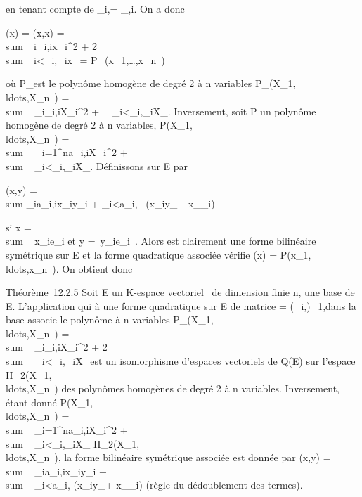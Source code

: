 \documentclass[]{article}
\begin{document}
en tenant compte de \omega\_i,\jmath = \omega\_\jmath,i. On a donc

\Phi(x) = \phi(x,x) = \\sum
\_i\omega\_i,ix\_i^2 +
2\\sum
\_i\textless{}\jmath\omega\_i,\jmathx\_ix\_\jmath =
P\_\Phi(x\_1,\ldots,x\_n~)

où P\_\Phi est le polynôme homogène de degré 2 à n variables
P\_\Phi(X\_1,\\ldots,X\_n~)
= \\sum ~
\_i\omega\_i,iX\_i^2 +\
\sum ~
\_i\textless{}\jmath\omega\_i,\jmathX\_iX\_\jmath.
Inversement, soit P un polynôme homogène de degré 2 à n variables,
P(X\_1,\\ldots,X\_n~)
= \\sum ~
\_i=1^na\_i,iX\_i^2
+ \\sum ~
\_i\textless{}\jmatha\_i,\jmathX\_iX\_\jmath. Définissons
\phi sur E par

\phi(x,y) = \\sum
\_ia\_i,ix\_iy\_i +
\sum \_i\textless{}\jmath a\_i,\jmath~
 (x\_iy\_\jmath +
x\_\jmathy\_i)

si x = \\sum ~
x\_ie\_i et y =\
\sum  y\_ie\_i~. Alors \phi est
clairement une forme bilinéaire symétrique sur E et la forme quadratique
associée vérifie \Phi(x) =
P(x\_1,\\ldots,x\_n~).
On obtient donc

Théorème~12.2.5 Soit E un K-espace vectoriel ~de dimension finie n, 
une base de E. L'application qui à une forme quadratique \Phi sur E de
matrice \Omega = (\omega\_i,\jmath)\_1\leqi,\jmath\leqn dans la base \mathcal{E} associe le
polynôme à n variables
P\_\Phi(X\_1,\\ldots,X\_n~)
= \\sum ~
\_i\omega\_i,iX\_i^2 +
2\\sum ~
\_i\textless{}\jmath\omega\_i,\jmathX\_iX\_\jmath est un
isomorphisme d'espaces vectoriels de Q(E) sur l'espace
H\_2(X\_1,\\ldots,X\_n~)
des polynômes homogènes de degré 2 à n variables. Inversement, étant
donné
P(X\_1,\\ldots,X\_n~)
= \\sum ~
\_i=1^na\_i,iX\_i^2
+ \\sum ~
\_i\textless{}\jmatha\_i,\jmathX\_iX\_\jmath \in
H\_2(X\_1,\\ldots,X\_n~),
la forme bilinéaire symétrique associée est donnée par \phi(x,y)
= \\sum ~
\_ia\_i,ix\_iy\_i
+ \\sum ~
\_i\textless{}\jmath a\_i,\jmath {}
(x\_iy\_\jmath + x\_\jmathy\_i) (règle du
dédoublement des termes).
\end{document}
